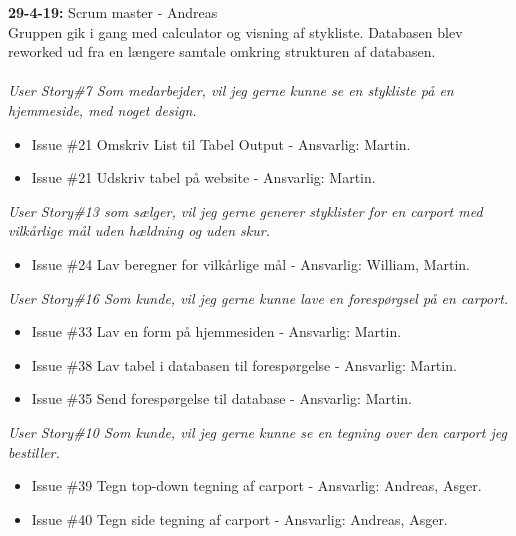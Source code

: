 \documentclass[11pt]{report}
\begin{document}
\noindent\textbf{29-4-19:} Scrum master - Andreas\\
Gruppen gik i gang med calculator og visning af stykliste. Databasen blev reworked ud fra en længere samtale omkring strukturen af databasen.\\\\
\textit{User Story\#7 Som medarbejder, vil jeg gerne kunne se en stykliste på en hjemmeside, med noget design.}
\begin{itemize}
\renewcommand\labelitemi{--}
\item Issue \#21 Omskriv List til Tabel Output - Ansvarlig: Martin.
\item Issue \#21 Udskriv tabel på website - Ansvarlig: Martin.
\end{itemize}
\textit{User Story\#13 som sælger, vil jeg gerne generer styklister for en carport med vilkårlige mål uden hældning og uden skur.}
\begin{itemize}
\renewcommand\labelitemi{--}
\item Issue \#24 Lav beregner for vilkårlige mål - Ansvarlig: William, Martin.
\end{itemize}
\textit{User Story\#16 Som kunde, vil jeg gerne kunne lave en forespørgsel på en carport.}
\begin{itemize}
\renewcommand\labelitemi{--}
\item Issue \#33 Lav en form på hjemmesiden - Ansvarlig: Martin.
\item Issue \#38 Lav tabel i databasen til forespørgelse - Ansvarlig: Martin.
\item Issue \#35 Send forespørgelse til database - Ansvarlig: Martin.
\end{itemize}
\textit{User Story\#10 Som kunde, vil jeg gerne kunne se en tegning over den carport jeg bestiller.}
\begin{itemize}
\renewcommand\labelitemi{--}
\item Issue \#39 Tegn top-down tegning af carport - Ansvarlig: Andreas, Asger.
\item Issue \#40 Tegn side tegning af carport - Ansvarlig: Andreas, Asger.
\end{itemize}
\end{document}
